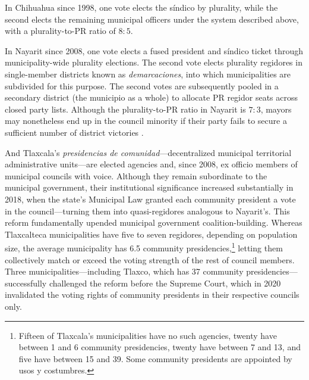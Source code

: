 \documentclass[letter,12pt]{article}
\begin{document}
In Chihuahua since 1998, one vote elects the síndico by plurality, while the second elects the remaining municipal officers under the system described above, with a plurality-to-PR ratio of $8:5$.

In Nayarit since 2008, one vote elects a fused president and síndico ticket through municipality-wide plurality elections. The second vote elects plurality regidores in single-member districts known as \emph{demarcaciones}, into which municipalities are subdivided for this purpose. The second votes are subsequently pooled in a secondary district (the municipio as a whole) to allocate PR regidor seats across closed party lists. Although the plurality-to-PR ratio in Nayarit is $7:3$, mayors may nonetheless end up in the council minority if their party fails to secure a sufficient number of district victories \citep{lucardi.magar.2019}.

And Tlaxcala's \emph{presidencias de comunidad}---decentralized municipal territorial administrative units---are elected agencies and, since 2008, ex officio members of municipal councils with voice. Although they remain subordinate to the municipal government, their institutional significance increased substantially in 2018, when the state's Municipal Law granted each community president a vote in the council---turning them into quasi-regidores analogous to Nayarit's. This reform fundamentally upended municipal government coalition-building. Whereas Tlaxcalteca municipalities have five to seven regidores, depending on population size, the average municipality has 6.5 community presidencies,\footnote{Fifteen of Tlaxcala's municipalities have no such agencies, twenty have between 1 and 6 community presidencies, twenty have between 7 and 13, and five have between 15 and 39. Some community presidents are appointed by usos y costumbres.} letting them collectively match or exceed the voting strength of the rest of council members. Three municipalities---including Tlaxco, which has 37 community presidencies---successfully challenged the reform before the Supreme Court, which in 2020 invalidated the voting rights of community presidents in their respective councils only.
\end{document}
